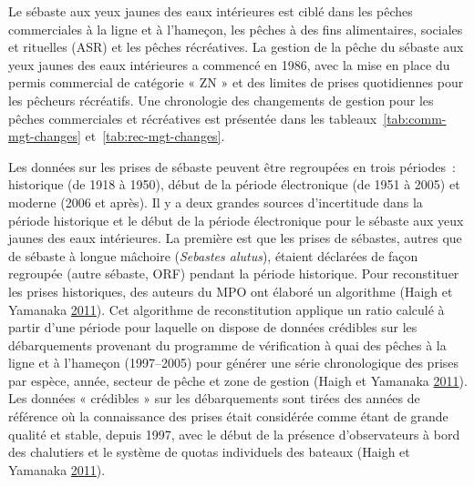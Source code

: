 \documentclass[french,11pt]{book}
\begin{document}
\clearpage

\label{app:catch-data}

Le sébaste aux yeux jaunes des eaux intérieures est ciblé dans les pêches commerciales à la ligne et à l'hameçon, les pêches à des fins alimentaires, sociales et rituelles (ASR) et les pêches récréatives. La gestion de la pêche du sébaste aux yeux jaunes des eaux intérieures a commencé en 1986, avec la mise en place du permis commercial de catégorie « ZN » et des limites de prises quotidiennes pour les pêcheurs récréatifs. Une chronologie des changements de gestion pour les pêches commerciales et récréatives est présentée dans les tableaux~\ref{tab:comm-mgt-changes} et~\ref{tab:rec-mgt-changes}.

\hypertarget{sec:com-catch-data}{%
\label{sec:com-catch-data}}

Les données sur les prises de sébaste peuvent être regroupées en trois périodes~: historique (de 1918 à 1950), début de la période électronique (de 1951 à 2005) et moderne (2006 et après). Il y a deux grandes sources d'incertitude dans la période historique et le début de la période électronique pour le sébaste aux yeux jaunes des eaux intérieures. La première est que les prises de sébastes, autres que de sébaste à longue mâchoire (\emph{Sebastes alutus}), étaient déclarées de façon regroupée (autre sébaste, ORF) pendant la période historique. Pour reconstituer les prises historiques, des auteurs du MPO ont élaboré un algorithme (Haigh et Yamanaka \protect\hyperlink{ref-haigh2011}{2011}). Cet algorithme de reconstitution applique un ratio calculé à partir d'une période pour laquelle on dispose de données crédibles sur les débarquements provenant du programme de vérification à quai des pêches à la ligne et à l'hameçon (1997--2005) pour générer une série chronologique des prises par espèce, année, secteur de pêche et zone de gestion (Haigh et Yamanaka \protect\hyperlink{ref-haigh2011}{2011}). Les données « crédibles » sur les débarquements sont tirées des années de référence où la connaissance des prises était considérée comme étant de grande qualité et stable, depuis 1997, avec le début de la présence d'observateurs à bord des chalutiers et le système de quotas individuels des bateaux (Haigh et Yamanaka \protect\hyperlink{ref-haigh2011}{2011}).
\end{document}
